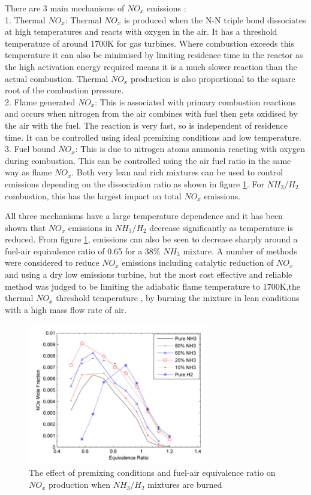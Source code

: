 \documentclass[11pt, oneside]{article}
\begin{document}
There are 3 main mechanisms of $NO_x$ emissions \cite{netl}:\\ 
1. Thermal $NO_x$: Thermal $NO_x$ is produced when the N-N triple bond dissociates at high temperatures and reacts with oxygen in the air. It has a threshold temperature of around 1700K for gas turbines. Where combustion exceeds this temperature it can also be minimised by limiting residence time in the reactor as the high activation energy required means it is a much slower reaction than the actual combustion. Thermal $NO_x$ production is also proportional to the square root of the combustion pressure.
\\2. Flame generated $NO_x$: This is associated with primary combustion reactions and occurs when nitrogen from the air combines with fuel then gets oxidised by the air with the fuel. The reaction is very fast, so is independent of residence time. It can be controlled using ideal premixing conditions and low temperature.
\\3. Fuel bound $NO_x$: This is due to nitrogen atoms ammonia reacting with oxygen during combustion. This can be controlled using the air fuel ratio in the same way as flame $NO_x$. Both very lean and rich mixtures can be used to control emissions depending on the dissociation ratio as shown in figure \ref{fig:NOxemissions}. For $NH_3/H_2$ combustion, this has the largest impact on total $NO_x$ emissions. \cite{junLi}
  
All three mechanisms have a large temperature dependence and it has been shown that $NO_x$ emissions in $NH_3/H_2$ decrease significantly as temperature is reduced. From figure \ref{fig:NOxemissions}, emissions can also be seen to decrease sharply around a fuel-air equivalence ratio of 0.65 for a $38\%$ $NH_3$ mixture. A number of methods were considered to reduce $NO_x$ emissions including catalytic reduction of $NO_x$ and using a dry low emissions turbine, but the most cost effective and reliable method was judged to be limiting the adiabatic flame temperature to 1700K,the thermal $NO_x$ threshold temperature \cite{netl}, by burning the mixture in lean conditions with a high mass flow rate of air.

\begin{figure} [h]
\centering
\includegraphics[width=0.7\textwidth]{./pictures/NOxemissions.png}
  \caption{The effect of premixing conditions and fuel-air equivalence ratio on $NO_x$ production when $NH_3/H_2$ mixtures are burned \cite{Nozari2015}} \label{fig:NOxemissions}
  \end{figure}
\end{document}
